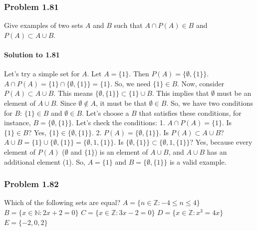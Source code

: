 \documentclass{article}
\begin{document}
\subsubsection*{Problem 1.81}
Give examples of two sets $A$ and $B$ such that $A \cap P(A) \in B$ and $P(A) \subset A \cup B$.

\paragraph*{Solution to 1.81}
Let's try a simple set for $A$.
Let $A = \{1\}$.
Then $P(A) = \{\emptyset, \{1\}\}$.
$A \cap P(A) = \{1\} \cap \{\emptyset, \{1\}\} = \{1\}$.
So, we need $\{1\} \in B$.
Now, consider $P(A) \subset A \cup B$. This means $\{\emptyset, \{1\}\} \subset \{1\} \cup B$.
This implies that $\emptyset$ must be an element of $A \cup B$. Since $\emptyset \notin A$, it must be that $\emptyset \in B$.
So, we have two conditions for $B$: $\{1\} \in B$ and $\emptyset \in B$.
Let's choose a $B$ that satisfies these conditions, for instance, $B = \{\emptyset, \{1\}\}$.
Let's check the conditions:
1. $A \cap P(A) = \{1\}$. Is $\{1\} \in B$? Yes, $\{1\} \in \{\emptyset, \{1\}\}$.
2. $P(A) = \{\emptyset, \{1\}\}$. Is $P(A) \subset A \cup B$?
   $A \cup B = \{1\} \cup \{\emptyset, \{1\}\} = \{\emptyset, 1, \{1\}\}$.
   Is $\{\emptyset, \{1\}\} \subset \{\emptyset, 1, \{1\}\}$? Yes, because every element of $P(A)$ ($\emptyset$ and $\{1\}$) is an element of $A \cup B$, and $A \cup B$ has an additional element ($1$).
So, $A = \{1\}$ and $B = \{\emptyset, \{1\}\}$ is a valid example.

\subsubsection*{Problem 1.82}
Which of the following sets are equal?
$A = \{n \in \mathbb{Z} : -4 \le n \le 4\}$
$B = \{x \in \mathbb{N} : 2x + 2 = 0\}$
$C = \{x \in \mathbb{Z} : 3x - 2 = 0\}$
$D = \{x \in \mathbb{Z} : x^3 = 4x\}$
$E = \{-2, 0, 2\}$
\end{document}
